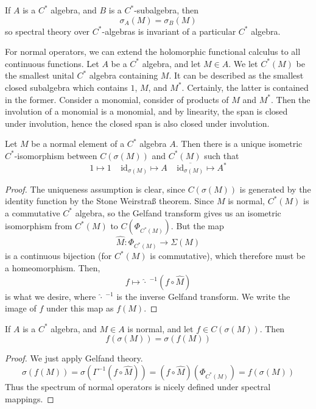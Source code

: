 \begin{corollary}
    If $A$ is a $C^*$ algebra, and $B$ is a $C^*$-subalgebra, then
    \[ \sigma_A(M) = \sigma_B(M) \]
    so spectral theory over $C^*$-algebras is invariant of a particular $C^*$ algebra.
\end{corollary}

For normal operators, we can extend the holomorphic functional calculus to all continuous functions. Let $A$ be a $C^*$ algebra, and let $M \in A$. We let $C^*(M)$ be the smallest unital $C^*$ algebra containing $M$. It can be described as the smallest closed subalgebra which contains $1$, $M$, and $M^*$. Certainly, the latter is contained in the former. Consider a monomial, consider of products of $M$ and $M^*$. Then the involution of a monomial is a monomial, and by linearity, the span is closed under involution, hence the closed span is also closed under involution.

\begin{theorem}
    Let $M$ be a normal element of a $C^*$ algebra $A$. Then there is a unique isometric $C^*$-isomorphism between $C(\sigma(M))$ and $C^*(M)$ such that
    \[ 1 \mapsto 1\ \ \ \ \ \text{id}_{\sigma(M)} \mapsto A\ \ \ \ \ \overline{\text{id}_{\sigma(M)}} \mapsto A^* \]
\end{theorem}
\begin{proof}
    The uniqueness assumption is clear, since $C(\sigma(M))$ is generated by the identity function by the Stone Weirstra{\ss} theorem. Since $M$ is normal, $C^*(M)$ is a commutative $C^*$ algebra, so the Gelfand transform gives us an isometric isomorphism from $C^*(M)$ to $C(\Phi_{C^*(M)})$. But the map
    \[ \widehat{M}: \Phi_{C^*(M)} \to \Sigma(M) \]
    is a continuous bijection (for $C^*(M)$ is commutative), which therefore must be a homeomorphism. Then,
    \[ f \mapsto \widehat{\cdot}\ ^{-1}(f \circ \widehat{M}) \]
    is what we desire, where $\widehat{\cdot}\ ^{-1}$ is the inverse Gelfand transform.  We write the image of $f$ under this map as $f(M)$.
\end{proof}

\begin{corollary}
    If $A$ is a $C^*$ algebra, and $M \in A$ is normal, and let $f \in C(\sigma(M))$. Then
    \[ f(\sigma(M)) = \sigma(f(M)) \]
\end{corollary}
\begin{proof}
    We just apply Gelfand theory.
    \[ \sigma(f(M)) = \sigma(\Gamma^{-1}(f \circ \widehat{M})) = (f \circ \widehat{M})(\Phi_{C^*(M)}) = f(\sigma(M)) \]
    Thus the spectrum of normal operators is nicely defined under spectral mappings.
\end{proof}

